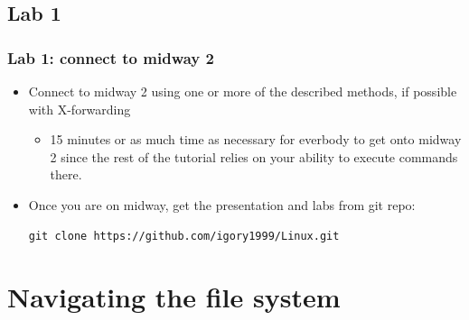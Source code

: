 \documentclass{beamer}
\begin{document}
\subsection{Lab 1}
\begin{frame}[fragile]
  \frametitle{Lab 1: connect to midway 2}
  \begin{itemize}
  \item Connect to midway 2 using one or more of the described methods, if possible with X-forwarding 
    \begin{itemize}
    \item 15 minutes or as much time as necessary for everbody to get onto midway 2 since the rest of the tutorial relies on your ability to
    execute commands there.
    \end{itemize}

    \item Once you are on midway, get the presentation and labs from git repo:
{\small
{\color{mycolorcli}
\begin{verbatim}
git clone https://github.com/igory1999/Linux.git
\end{verbatim}
}
}

  \end{itemize}
\end{frame}

\section{Navigating the file system}
\end{document}
